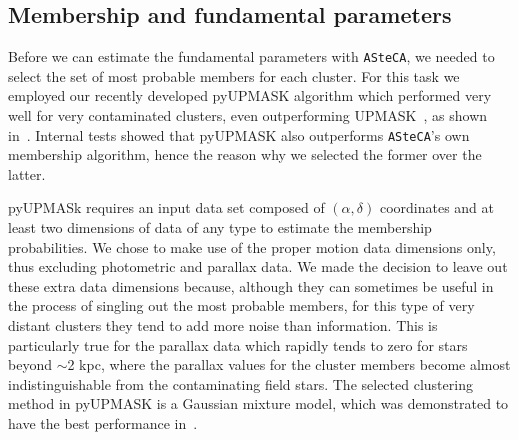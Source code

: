 \documentclass{aa}
\begin{document}
 \subsection{Membership and fundamental parameters}
  \label{ssec:fund_pars}

  Before we can estimate the fundamental parameters with \texttt{ASteCA}, we
  needed to select the set of most probable members for each cluster. For this
  task we employed our recently developed pyUPMASK algorithm which 
     performed very well for very contaminated clusters, even outperforming
  UPMASK~\citep{Krone2014}, as shown in~\cite{Pera_2021}. Internal tests
  showed that pyUPMASK also outperforms \texttt{ASteCA}'s own membership
  algorithm, hence the reason why we selected the former over the latter.

  pyUPMASk requires an input data set composed of $(\alpha, \delta)$ coordinates
  and at least two dimensions of data of any type to estimate the membership
  probabilities. We chose to make use of the proper motion data dimensions only,
  thus excluding photometric and parallax data.
  We made the decision to leave out these extra data dimensions because,
  although they can  sometimes be useful in the process of singling out the most
  probable members, for this type of very distant clusters they tend to add
  more noise than information.
  This is particularly true for the parallax data which
  rapidly tends to zero for stars beyond $\sim$2 kpc, where the parallax values
  for the cluster members become almost indistinguishable from the contaminating
  field stars. The selected clustering method in pyUPMASK is a Gaussian mixture
  model, which was demonstrated to have the best performance
  in~\citet[][see Sect. 4]{Pera_2021}.
\end{document}

